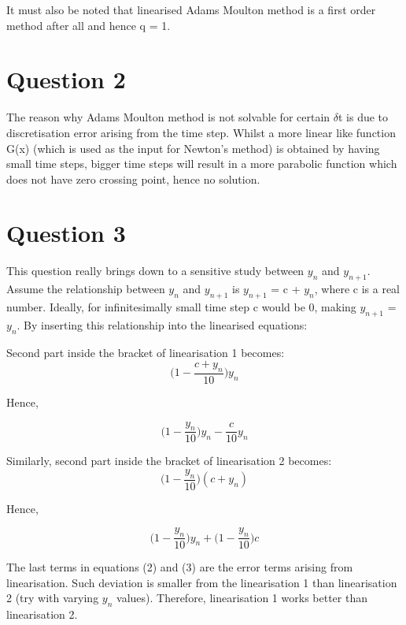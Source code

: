 \documentclass[preprint,authoryear,10pt]{elsarticle}
\begin{document}
It must also be noted that linearised Adams Moulton method is a first order method after all and hence q = 1.

\section{Question 2}

The reason why Adams Moulton method is not solvable for certain $\delta$t is due to discretisation error arising from the time step. Whilst a more linear like function G(x) (which is used as the input for Newton's method) is obtained by having small time steps, bigger time steps will result in a more parabolic function which does not have zero crossing point, hence no solution.

\section{Question 3}

This question really brings down to a sensitive study between $y_{n}$ and $y_{n+1}$.  Assume the relationship between $y_{n}$ and $y_{n+1}$ is $y_{n+1}$ = c + $y_{n}$, where c is a real number. Ideally, for infinitesimally small time step c would be 0, making $y_{n+1}$ = $y_{n}$. By inserting this relationship into the linearised equations:
\newline

Second part inside the bracket of linearisation 1 becomes:
\begin{equation}
\Big(1-\frac{c+y_{n}}{10}\Big)y_{n}
\end{equation}

Hence,

\begin{equation}
\Big(1-\frac{y_{n}}{10}\Big)y_{n} - \frac{c}{10}y_{n}
\end{equation}

Similarly, second part inside the bracket of linearisation 2 becomes:
\begin{equation}
\Big(1-\frac{y_{n}}{10}\Big)(c+y_{n})
\end{equation}

Hence,

\begin{equation}
\Big(1-\frac{y_{n}}{10}\Big)y_{n} + \Big(1-\frac{y_{n}}{10}\Big)c
\end{equation}

The last terms in equations (2) and (3) are the error terms arising from linearisation. Such deviation is smaller from the linearisation 1 than linearisation 2 (try with varying $y_{n}$ values). Therefore, linearisation 1 works better than linearisation 2. 
\end{document}
